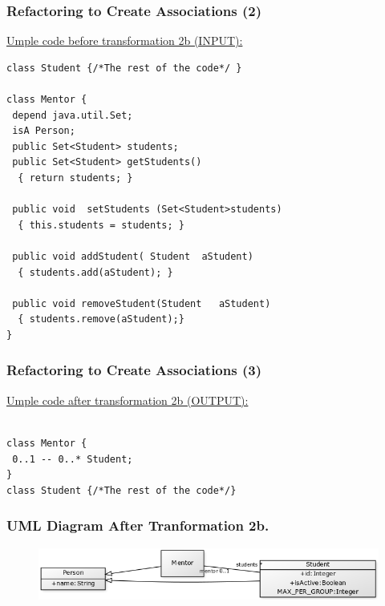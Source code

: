 \documentclass[xcolor=table]{beamer}
\begin{document}
\begin{frame}[fragile] %
\frametitle{Refactoring to Create Associations (2)}
\underline{Umple code before transformation 2b (INPUT): }

\begin{lstlisting}[style=UmpleInStyle]
class Student {/*The rest of the code*/ } 

class Mentor { 
 depend java.util.Set; 
 isA Person;
 public Set<Student> students; 
 public Set<Student> getStudents()  
  { return students; } 

 public void  setStudents (Set<Student>students) 
  { this.students = students; } 

 public void addStudent( Student  aStudent) 
  { students.add(aStudent); }

 public void removeStudent(Student   aStudent)
  { students.remove(aStudent);}
} 

\end{lstlisting}

\end{frame}

\begin{frame}[fragile] %
\frametitle{Refactoring to Create Associations (3)}
\underline{Umple code after transformation 2b (OUTPUT): }
\begin{lstlisting}[style=UmpleOutStyle]

class Mentor {
 0..1 -- 0..* Student; 
}
class Student {/*The rest of the code*/}

\end{lstlisting}
\end{frame}


\begin{frame}
\frametitle{UML Diagram After Tranformation 2b.}
\begin{figure}
\includegraphics[width=0.99\linewidth]{Figures/uml3.png}
\end{figure}
\end{frame}
\end{document}
